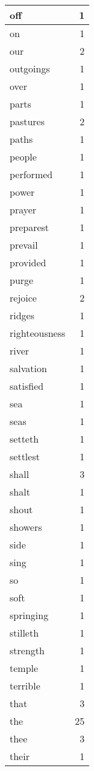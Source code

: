 \begin{center}
\begin{longtable}{l|r}
off & 1 \\ \hline
on & 1 \\ \hline
our & 2 \\ \hline
outgoings & 1 \\ \hline
over & 1 \\ \hline
parts & 1 \\ \hline
pastures & 2 \\ \hline
paths & 1 \\ \hline
people & 1 \\ \hline
performed & 1 \\ \hline
power & 1 \\ \hline
prayer & 1 \\ \hline
preparest & 1 \\ \hline
prevail & 1 \\ \hline
provided & 1 \\ \hline
purge & 1 \\ \hline
rejoice & 2 \\ \hline
ridges & 1 \\ \hline
righteousness & 1 \\ \hline
river & 1 \\ \hline
salvation & 1 \\ \hline
satisfied & 1 \\ \hline
sea & 1 \\ \hline
seas & 1 \\ \hline
setteth & 1 \\ \hline
settlest & 1 \\ \hline
shall & 3 \\ \hline
shalt & 1 \\ \hline
shout & 1 \\ \hline
showers & 1 \\ \hline
side & 1 \\ \hline
sing & 1 \\ \hline
so & 1 \\ \hline
soft & 1 \\ \hline
springing & 1 \\ \hline
stilleth & 1 \\ \hline
strength & 1 \\ \hline
temple & 1 \\ \hline
terrible & 1 \\ \hline
that & 3 \\ \hline
the & 25 \\ \hline
thee & 3 \\ \hline
their & 1 \\ \hline

\end{longtable}
\end{center}
